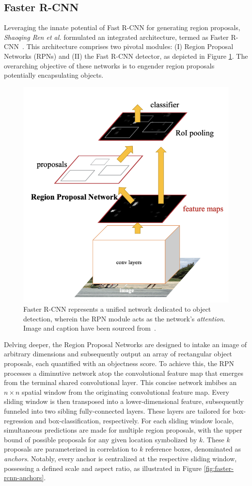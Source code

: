 \subsection{Faster R-CNN}
Leveraging the innate potential of Fast R-CNN for generating region proposals, \textit{Shaoqing Ren et al.} formulated an integrated architecture, termed as Faster R-CNN~\cite{DBLP:journals/corr/RenHG015}. This architecture comprises two pivotal modules: (I) Region Proposal Networks (RPNs) and (II) the Fast R-CNN detector, as depicted in Figure \ref{fig:faster-rcnn}. The overarching objective of these networks is to engender region proposals potentially encapsulating objects.

\begin{figure}[htb]
    \centering
    \includegraphics[width=0.5\linewidth]{figures/chapters-imgs/30/faster-rcnn.png}
    \caption[Faster R-CNN represents a unified network dedicated to object detection.]{Faster R-CNN represents a unified network dedicated to object detection, wherein the RPN module acts as the network's \textit{attention}. Image and caption have been sourced from~\cite{DBLP:journals/corr/RenHG015}.}
    \label{fig:faster-rcnn}
\end{figure}

Delving deeper, the Region Proposal Networks are designed to intake an image of arbitrary dimensions and subsequently output an array of rectangular object proposals, each quantified with an objectness score. To achieve this, the RPN processes a diminutive network atop the convolutional feature map that emerges from the terminal shared convolutional layer. This concise network imbibes an $n \times n$ spatial window from the originating convolutional feature map. Every sliding window is then transposed into a lower-dimensional feature, subsequently funneled into two sibling fully-connected layers. These layers are tailored for box-regression and box-classification, respectively. For each sliding window locale, simultaneous predictions are made for multiple region proposals, with the upper bound of possible proposals for any given location symbolized by $k$. These $k$ proposals are parameterized in correlation to $k$ reference boxes, denominated as \textit{anchors}. Notably, every anchor is centralized at the respective sliding window, possessing a defined scale and aspect ratio, as illustrated in Figure \ref{fig:faster-rcnn-anchors}.

